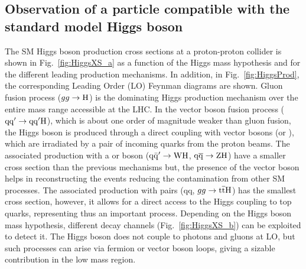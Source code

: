 %

\subsection{Observation of a particle compatible with the standard model Higgs boson}\label{subsec:HiggsLHC}

The SM Higgs boson production cross sections at a proton-proton collider is shown in Fig.~\ref{fig:HiggsXS_a} as a function of the Higgs mass hypothesis and for the different leading production mechanisms.
In addition, in Fig.~\ref{fig:HiggsProd}, the corresponding Leading Order (LO) Feynman diagrams are shown.
Gluon fusion process ($gg \to \mathrm{H}$) is the dominating Higgs production mechanism over the entire mass range accessible at the LHC.
In the vector boson fusion process  ($\mathrm{qq}^\prime \to \mathrm{qq}^\prime \mathrm{H}$), which is about one order of magnitude weaker than gluon fusion, the Higgs boson is produced through a direct coupling with vector bosons (\PW or \PZ), which are irradiated by a pair of incoming quarks from the proton beams. 
The associated production with a \PW or \PZ boson ($\mathrm{q\bar{q}}^\prime \to \mathrm{W}\mathrm{H}$, $\mathrm{q}\overline{\mathrm{q}} \to \mathrm{Z}\mathrm{H}$) have a smaller cross section than the previous mechanisms but, the presence of the vector boson helps in reconstructing the events reducing the contamination from other SM processes.
The associated production with \ttbar pairs (qq, $gg \to \mathrm{t}\overline{\mathrm{t}}\mathrm{H}$) has the smallest cross section, however, it allows for a direct access to the Higgs coupling to top quarks, representing thus an important process.
Depending on the Higgs boson mass hypothesis, different decay channels (Fig.~\ref{fig:HiggsXS_b}) can be exploited to detect it.
The Higgs boson does not couple to photons and gluons at LO, but such processes can arise via fermion or vector boson loops, giving a sizable contribution in the low mass region.\\

